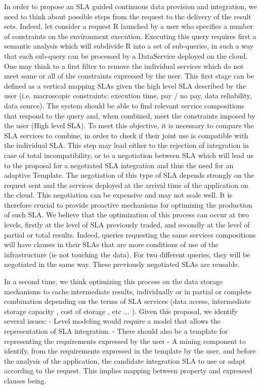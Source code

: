 In order to propose an SLA guided continuous data provision and integration, we need to think about possible steps from the request to the delivery of the result sets. Indeed, let consider a request R launched by a user who specifies a number of constraints on the environment execution. Executing this query requires first a semantic analysis which will subdivide R into a set of sub-queries, in such a way that each sub-query can be processed by a DataService deployed on the cloud. One may think to a first filter to remove the individual services which do not meet some or all of the constraints expressed by the user. This first stage can be defined as a vertical mapping SLAs given the high level SLA described by the user (i.e. macroscopic constraints: execution time, pay / no pay, data reliability, data source). The system should be able to find relevant service compositions that respond to the query and, when combined, meet the constraints imposed by the user (High level SLA).
To meet this objective, it is necessary to compare the SLA services to combine, in order to check if their joint use is compatible with the individual SLA. This step may lead either to the rejection of integration in case of total incompatibility, or to a negotiation between SLA which will lead us to the proposal for a negotiated SLA integration and thus the need for an adaptive Template.
The negotiation of this type of SLA depends strongly on the request sent and the services deployed at the arrival time of the application on the cloud. This negotiation can be expensive and may not scale well. It is therefore crucial to provide proactive mechanisms for optimizing the production of such SLA. We believe that the optimization of this process can occur at two levels, firstly at the level of SLA previously traded, and secondly at the level of partial or total results. Indeed, queries requesting the same services compositions will have clauses in their SLAs that are more conditions of use of the infrastructure (ie not touching the data). For two different queries, they will be negotiated in the same way. These previously negotiated SLAs are reusable.

In a second time, we think optimizing this process on the data storage mechanisms to cache intermediate results, individually or in partial or complete combination depending on the terms of SLA services (data access, intermediate storage capacity , cost of storage , etc ... ).
Given this proposal, we identify several issues:
- Level modeling would require a model that allows the representation of SLA integration.
- There should also be a template for representing the requirements expressed by the user
- A mining component to identify, from the requirements expressed in the template by the user, and before the analysis of the application, the candidate integration SLA to use or adapt according to the request. This implies mapping between property and expressed clauses being.

